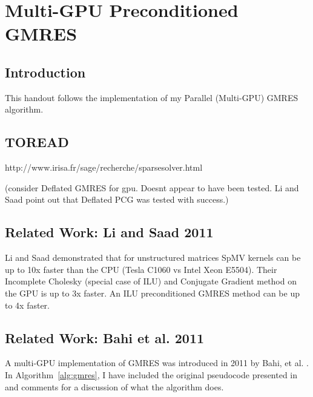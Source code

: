 \chapter{Multi-GPU Preconditioned GMRES}


\section{Introduction}
This handout follows the implementation of my Parallel (Multi-GPU) GMRES algorithm. 

\section{TOREAD} 

http://www.irisa.fr/sage/recherche/sparsesolver.html

(consider Deflated GMRES for gpu. Doesnt appear to have been tested. Li and Saad point out that Deflated PCG was tested with success.)

\section{Related Work: Li and Saad 2011} 

Li and Saad demonstrated that for unstructured matrices SpMV kernels can be up to 10x faster than the CPU (Tesla C1060 vs Intel Xeon E5504). 
Their Incomplete Cholesky (special case of ILU) and Conjugate Gradient method on the GPU is up to 3x faster. 
An ILU preconditioned GMRES method can be up to 4x faster. 


\section{Related Work: Bahi et al. 2011}
A multi-GPU implementation of GMRES was introduced in 2011 by Bahi, et al. \cite{Bahi2011}. In Algorithm~\ref{alg:gmres}, I have included the original pseudocode presented in \cite{Bahi2011} and {\color{blue}comments} for a discussion of what the algorithm does. 

